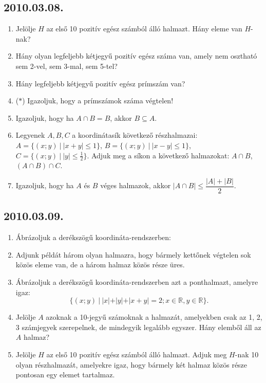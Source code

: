 \subsection*{2010.03.08.}
\begin{enumerate}
\item Jelölje $H$ az első 10 pozitív egész számból álló halmazt. Hány eleme van $H$-nak?
\item Hány olyan legfeljebb kétjegyű pozitív egész száma van, amely nem osztható sem 2-vel, sem 3-mal, sem 5-tel?
\item Hány legfeljebb kétjegyű pozitív egész prímszám van?
\item ($*$) Igazoljuk, hogy a prímszámok száma végtelen!
\item Igazoljuk, hogy ha $A\cap B=B$, akkor $B\subseteq A$.
\item Legyenek $A, B, C$ a koordinátasík következő részhalmazai: 
$A=\{(x;y)~|~|x+y|\le 1\}$,
$B=\{(x;y)~|~|x-y|\le 1\}$,
$C=\{(x;y)~|~|y|\le \frac{1}{2}\}$. Adjuk meg a síkon a következő halmazokat:
$A\cap B$, $(A\cap B)\cap C$.
\item Igazoljuk, hogy ha $A$ és $B$ véges halmazok, akkor $|A\cap B|\le \dfrac{|A|+|B|}{2}$.
\end{enumerate}
\subsection*{2010.03.09.}
\begin{enumerate}
\item Ábrázoljuk a derékszögű koordináta-rendszerben:
\item Adjunk példát három olyan halmazra, hogy bármely kettőnek végtelen sok közös eleme van, de a három halmaz közös része üres.
\item  Ábrázoljuk a derékszögű koordináta-rendszerben azt a ponthalmazt, amelyre igaz:
$$\{(x;y)~|~|x|+|y|+|x+y|=2; x\in\mathbb{R}, y\in\mathbb{R}\}.$$
\item Jelölje $A$ azoknak a 10-jegyű számoknak a halmazát, amelyekben csak az 1, 2, 3 számjegyek szerepelnek, de mindegyik legalább egyszer. Hány elemből áll az $A$ halmaz?
\item Jelölje $H$ az első 10 pozitív egész számból álló halmazt. Adjuk meg $H$-nak 10 olyan részhalmazát, amelyekre igaz, hogy bármely két halmaz közös része pontosan egy elemet tartalmaz.
\end{enumerate}
